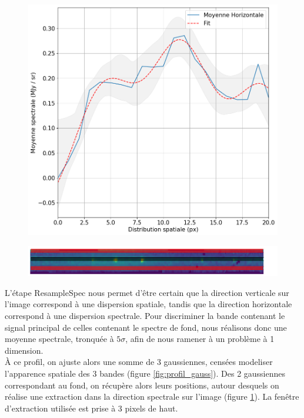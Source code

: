 \documentclass[11pt, a4paper]{article}
\begin{document}
\begin{figure}
  \begin{minipage}{\linewidth}
    \centering\captionsetup[subfigure]{justification=centering}
    \includegraphics[width=\linewidth]{assets/fit_gaussian.png}
    \label{fig:profil_gauss}
    \par
    \vfill
    \includegraphics[width=\linewidth]{assets/extraction.png}
    \label{fig:extraction}
  \end{minipage}
\caption*{}
\end{figure}

L'étape ResampleSpec nous permet d'être certain que la direction verticale sur l'image correspond à une dispersion spatiale, tandis que la direction horizontale correspond à une dispersion spectrale. Pour discriminer la bande contenant le signal principal de celles contenant le spectre de fond, nous réalisons donc une moyenne spectrale, tronquée à $5\sigma$, afin de nous ramener à un problème à 1 dimension.\\

À ce profil, on ajuste alors une somme de 3 gaussiennes, censées modeliser l'apparence spatiale des 3 bandes (figure \ref{fig:profil_gauss}). Des 2 gaussiennes correspondant au fond, on récupère alors leurs positions, autour desquels on réalise une extraction dans la direction spectrale sur l'image (figure \ref{fig:extraction}). La fenêtre d'extraction utilisée est prise à 3 pixels de haut.


\printnoidxglossaries

\printbibliography %
\end{document}
